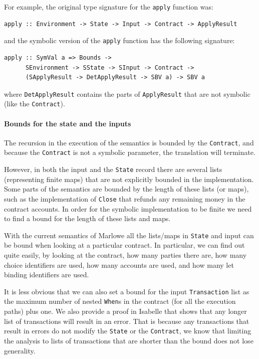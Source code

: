 \documentclass[runningheads]{llncs}
\begin{document}
For example, the original type signature for the \texttt{apply} function was:

\begin{verbatim}
apply :: Environment -> State -> Input -> Contract -> ApplyResult
\end{verbatim}

\noindent
and the symbolic version of the \texttt{apply} function has the following signature:

\begin{verbatim}
apply :: SymVal a => Bounds -> 
      SEnvironment -> SState -> SInput -> Contract -> 
      (SApplyResult -> DetApplyResult -> SBV a) -> SBV a
\end{verbatim}

\noindent
where \texttt{DetApplyResult} contains the parts of \texttt{ApplyResult} that are not symbolic (like the \texttt{Contract}).

\paragraph{Bounds for the state and the inputs}

The recursion in the execution of the semantics is bounded by the \texttt{Contract}, and because the \texttt{Contract} is not a symbolic parameter, the translation will terminate.

However, in both the input and the \texttt{State} record there are several lists (representing finite maps) that are not explicitly bounded in the implementation. Some parts of the semantics are bounded by the length of these lists (or maps), such as the implementation of \texttt{Close} that refunds any remaining money in the contract accounts.
In order for the symbolic implementation to be finite we need to find a bound for the length of these lists and maps.

With the current semantics of Marlowe all the lists/maps in \texttt{State} and input can be bound when looking at a particular contract. In particular, we can find out quite easily, by looking at the contract, how many parties there are, how many choice identifiers are used, how many accounts are used, and how many let binding identifiers are used.

It is less obvious that we can also set a bound for the input \texttt{Transaction} list as the maximum number of nested \texttt{When}s in the contract (for all the execution paths) plus one. We also provide a proof in Isabelle that shows that any longer list of transactions will result in an error. 
That is because any transactions that result in errors do not modify the \texttt{State} or the \texttt{Contract}, we know that limiting the analysis to lists of transactions that are shorter than the bound does not lose generality.
\end{document}
